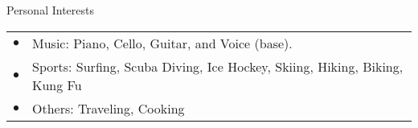 \documentclass{resume} %
\begin{document}
\begin{rSection}{Personal Interests}
  \begin{tabular}{ll}
      $\bullet$ & Music: Piano, Cello, Guitar, and Voice (base).\\
      $\bullet$ & Sports: Surfing, Scuba Diving, Ice Hockey, Skiing, Hiking, Biking, Kung Fu \\
      $\bullet$ & Others: Traveling, Cooking\\
  \end{tabular}
\end{rSection}

\end{document}
